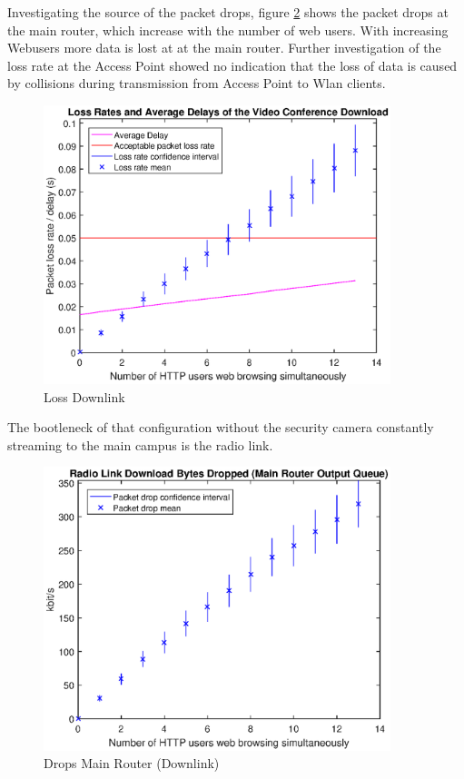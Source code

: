 \documentclass[a4paper,10pt]{book}\usepackage{graphicx}
\begin{document}
Investigating the source of the packet drops, figure \ref{fig:mainRdrops} shows the packet drops at the main router, which increase with the number of 
web users. With increasing Webusers more data is lost at at the main router. Further investigation of the loss rate at the Access Point showed no indication that 
the loss of data is caused by collisions during transmission from Access Point to Wlan clients.

\begin{figure}[!ht]
  \begin{center}
    \includegraphics[width=0.9\textwidth]{off_loss_conf_download.eps} 
    \caption{Loss Downlink}
    \label{fig:losslecdown} 
  \end{center}
\end{figure}
The bootleneck of that configuration without the security camera constantly streaming to the main campus 
is the radio link.
\begin{figure}[!ht]
  \begin{center}
  \includegraphics[width=0.9\textwidth]{off_main_router_drops.eps}
  \caption{Drops Main Router (Downlink)}
  \label{fig:mainRdrops}
  \end{center}
\end{figure}
\end{document}
